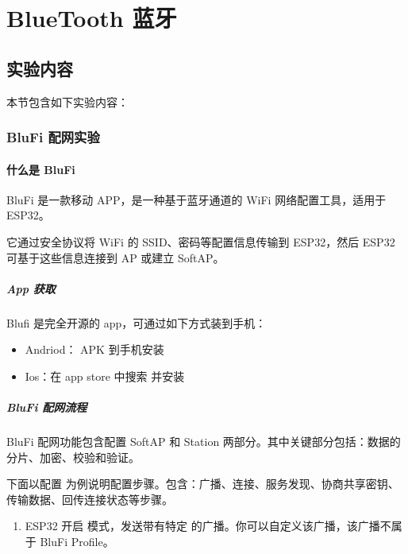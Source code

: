 \documentclass[a4paper,12pt,english]{sphinxmanual}
\begin{document}
{{\section{BlueTooth 蓝牙}
\label{\detokenize{exp-esp32/bluetooth/index:bluetooth}}\label{\detokenize{exp-esp32/bluetooth/index::doc}}

\subsection{实验内容}
\label{\detokenize{exp-esp32/bluetooth/index:id1}}
\sphinxAtStartPar
本节包含如下实验内容：

\sphinxstepscope


\subsubsection{BluFi 配网实验}
\label{\detokenize{exp-esp32/bluetooth/blufi:blufi}}\label{\detokenize{exp-esp32/bluetooth/blufi::doc}}

\paragraph{什么是 BluFi}
\label{\detokenize{exp-esp32/bluetooth/blufi:id1}}
\sphinxAtStartPar
BluFi 是一款移动 APP，是一种基于蓝牙通道的 Wi\sphinxhyphen{}Fi 网络配置工具，适用于 ESP32。

\sphinxAtStartPar
它通过安全协议将 Wi\sphinxhyphen{}Fi 的 SSID、密码等配置信息传输到 ESP32，然后 ESP32 可基于这些信息连接到 AP 或建立 SoftAP。


\subparagraph{App 获取}
\label{\detokenize{exp-esp32/bluetooth/blufi:app}}
\sphinxAtStartPar
Blufi 是完全开源的 app，可通过如下方式装到手机：
\begin{itemize}
\item {} 
\sphinxAtStartPar
Andriod： APK 到手机安装

\item {} 
\sphinxAtStartPar
Ios：在 app store 中搜索  并安装

\end{itemize}


\subparagraph{BluFi 配网流程}
\label{\detokenize{exp-esp32/bluetooth/blufi:id2}}
\sphinxAtStartPar
BluFi 配网功能包含配置 SoftAP 和 Station 两部分。其中关键部分包括：数据的分片、加密、校验和验证。

\sphinxAtStartPar
下面以配置  为例说明配置步骤。包含：广播、连接、服务发现、协商共享密钥、传输数据、回传连接状态等步骤。
\begin{enumerate}
%
\item {} 
\sphinxAtStartPar
ESP32 开启  模式，发送带有特定  的广播。你可以自定义该广播，该广播不属于 BluFi Profile。


\end{enumerate}}}
\end{document}
